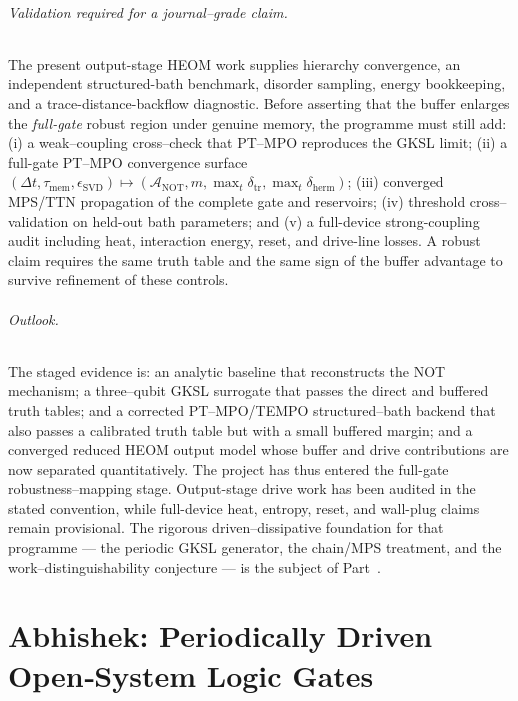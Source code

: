\documentclass[11pt,a4paper]{article}
\theoremstyle{plain}
\theoremstyle{definition}
\theoremstyle{remark}
\newcommand{\calA}{\mathcal{A}}
\begin{document}
\paragraph{Validation required for a journal--grade claim.} The present
output-stage HEOM work supplies hierarchy convergence, an independent
structured-bath benchmark, disorder sampling, energy bookkeeping, and a
trace-distance-backflow diagnostic.  Before asserting that the buffer
enlarges the \emph{full-gate} robust region under genuine memory, the
programme must still add: (i) a weak--coupling cross--check that PT--MPO
reproduces the GKSL limit; (ii) a full-gate PT--MPO convergence surface
$(\Delta t,\tau_{\mathrm{mem}},\epsilon_{\mathrm{SVD}})\mapsto
(\calA_{\mathrm{NOT}},m,\max_t\delta_{\mathrm{tr}},\max_t\delta_{\mathrm{herm}})$;
(iii) converged MPS/TTN propagation of the complete gate and reservoirs;
(iv) threshold cross--validation on held-out bath parameters; and (v) a
full-device strong-coupling audit including heat, interaction energy,
reset, and drive-line losses. A robust claim requires the same truth table
and the same sign of the buffer advantage to survive refinement of these
controls.

\paragraph{Outlook.} The staged evidence is: an analytic baseline that
reconstructs the NOT mechanism; a three--qubit GKSL surrogate that passes
the direct and buffered truth tables; and a corrected PT--MPO/TEMPO
structured--bath backend that also passes a calibrated truth table but with
a small buffered margin; and a converged reduced HEOM output model whose
buffer and drive contributions are now separated quantitatively. The
project has thus entered the full-gate robustness--mapping stage.
Output-stage drive work has been audited in the stated convention, while
full-device heat, entropy, reset, and wall-plug claims remain provisional.
The rigorous driven--dissipative
foundation for that programme --- the periodic GKSL generator, the
chain/MPS treatment, and the work--distinguishability conjecture --- is the
subject of Part~\ref{part:abhishek}.

\clearpage

\part{Abhishek: Periodically Driven Open‑System Logic Gates}
\label{part:abhishek}
\end{document}
